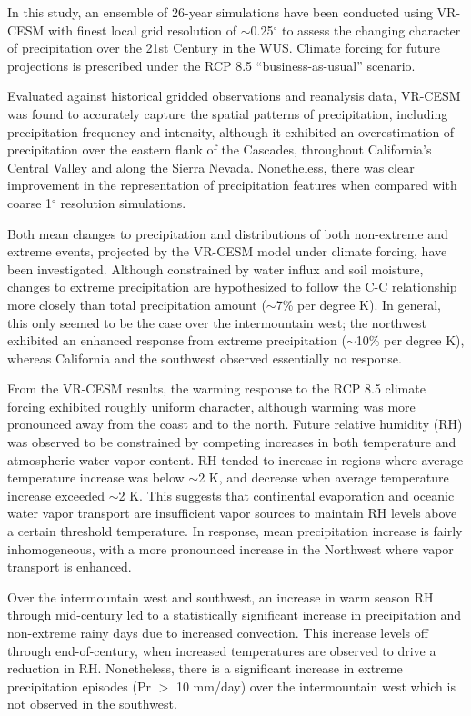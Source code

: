In this study, an ensemble of 26-year simulations have been conducted using VR-CESM with finest local grid resolution of $\sim$0.25$^\circ$ to assess the changing character of precipitation over the 21st Century in the WUS. Climate forcing for future projections is prescribed under the RCP 8.5 ``business-as-usual'' scenario. 

Evaluated against historical gridded observations and reanalysis data, VR-CESM was found to accurately capture the spatial patterns of precipitation, including precipitation frequency and intensity, although it exhibited an overestimation of precipitation over the eastern flank of the Cascades, throughout California's Central Valley and along the Sierra Nevada.  Nonetheless, there was clear improvement in the representation of precipitation features when compared with coarse 1$^\circ$ resolution simulations.

Both mean changes to precipitation and distributions of both non-extreme and extreme events, projected by the VR-CESM model under climate forcing, have been investigated.  Although constrained by water influx and soil moisture, changes to extreme precipitation are hypothesized to follow the C-C relationship more closely than total precipitation amount ($\sim$7\% per degree K).  In general, this only seemed to be the case over the intermountain west; the northwest exhibited an enhanced response from extreme precipitation ($\sim$10\% per degree K), whereas California and the southwest observed essentially no response.

From the VR-CESM results, the warming response to the RCP 8.5 climate forcing exhibited roughly uniform character, although warming was more pronounced away from the coast and to the north.  Future relative humidity (RH) was observed to be constrained by competing increases in both temperature and atmospheric water vapor content. RH tended to increase in regions where average temperature increase was below $\sim$2 K, and decrease when average temperature increase exceeded $\sim$2 K. This suggests that continental evaporation and oceanic water vapor transport are insufficient vapor sources to maintain RH levels above a certain threshold temperature.  In response, mean precipitation increase is fairly inhomogeneous, with a more pronounced increase in the Northwest where vapor transport is enhanced.

Over the intermountain west and southwest, an increase in warm season RH through mid-century led to a statistically significant increase in precipitation and non-extreme rainy days due to increased convection. This increase levels off through end-of-century, when increased temperatures are observed to drive a reduction in RH.  Nonetheless, there is a significant increase in extreme precipitation episodes (Pr $>$ 10 mm/day) over the intermountain west which is not observed in the southwest.

